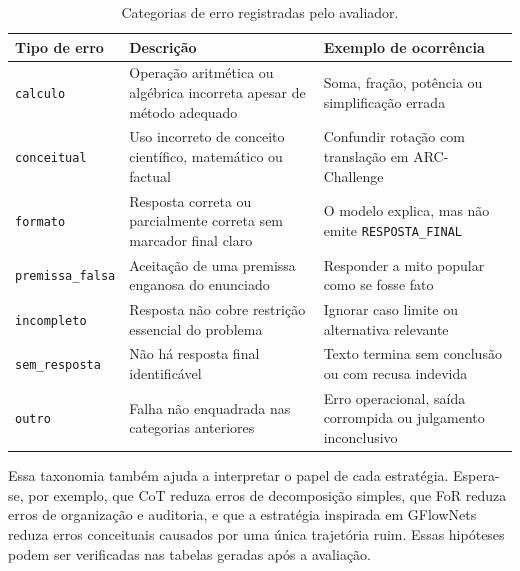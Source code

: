 \documentclass[12pt]{article}
\begin{document}
\begin{table}[ht]
\centering
\small
\caption{Categorias de erro registradas pelo avaliador.}
\label{tab:erros}
\begin{tabular}{|p{3cm}|p{5.3cm}|p{4.2cm}|}
\hline
\textbf{Tipo de erro} & \textbf{Descrição} & \textbf{Exemplo de ocorrência} \\
\hline
\texttt{calculo} & Operação aritmética ou algébrica incorreta apesar de método adequado & Soma, fração, potência ou simplificação errada \\
\hline
\texttt{conceitual} & Uso incorreto de conceito científico, matemático ou factual & Confundir rotação com translação em ARC-Challenge \\
\hline
\texttt{formato} & Resposta correta ou parcialmente correta sem marcador final claro & O modelo explica, mas não emite \texttt{RESPOSTA\_FINAL} \\
\hline
\texttt{premissa\_falsa} & Aceitação de uma premissa enganosa do enunciado & Responder a mito popular como se fosse fato \\
\hline
\texttt{incompleto} & Resposta não cobre restrição essencial do problema & Ignorar caso limite ou alternativa relevante \\
\hline
\texttt{sem\_resposta} & Não há resposta final identificável & Texto termina sem conclusão ou com recusa indevida \\
\hline
\texttt{outro} & Falha não enquadrada nas categorias anteriores & Erro operacional, saída corrompida ou julgamento inconclusivo \\
\hline
\end{tabular}
\end{table}

Essa taxonomia também ajuda a interpretar o papel de cada estratégia. Espera-se, por exemplo, que CoT reduza erros de decomposição simples, que FoR reduza erros de organização e auditoria, e que a estratégia inspirada em GFlowNets reduza erros conceituais causados por uma única trajetória ruim. Essas hipóteses podem ser verificadas nas tabelas geradas após a avaliação.
\end{document}
